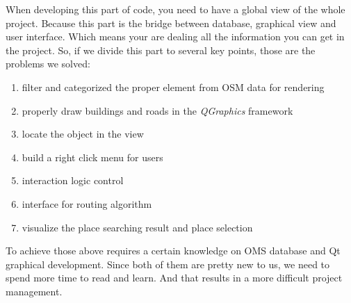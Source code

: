 \documentclass[a4paper, 12pt, english]{book}
\begin{document}
When developing this part of code, you need to have a global view of the whole project. Because this part is the bridge between database, graphical view and user interface. Which means your are dealing all the information you can get in the project. So, if we divide this part to several key points, those are the problems we solved:
\begin{enumerate}
	\item filter and categorized the proper element from OSM data for rendering
	\item properly draw buildings and roads in the {\textit{QGraphics}} framework
	\item locate the object in the view
	\item build a right click menu for users
	\item interaction logic control
	\item interface for routing algorithm
	\item visualize the place searching result and place selection
\end{enumerate}

To achieve those above requires a certain knowledge on OMS database and Qt graphical development. Since both of them are pretty new to us, we need to spend more time to read and learn. And that results in a more difficult project management.
\end{document}
